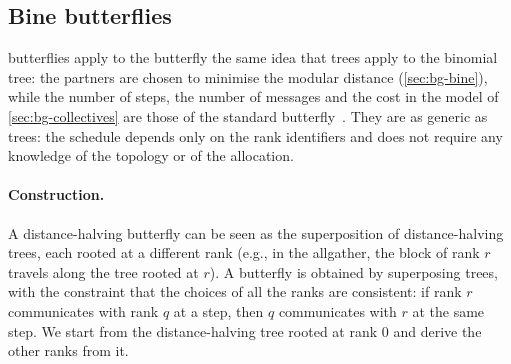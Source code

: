 \subsection{Bine butterflies}\label{sec:bg-bine-butterfly}

\bine{} butterflies apply to the butterfly the same idea that \bine{} trees apply to the binomial tree: the partners are chosen to minimise the modular distance (\cref{sec:bg-bine}), while the number of steps, the number of messages and the cost in the model of \cref{sec:bg-collectives} are those of the standard butterfly~\cite{desensi2025bine}.
They are as generic as \bine{} trees: the schedule depends only on the rank identifiers and does not require any knowledge of the topology or of the allocation.

\paragraph{Construction.}
A distance-halving butterfly can be seen as the superposition of distance-halving trees, each rooted at a different rank (e.g., in the allgather, the block of rank $r$ travels along the tree rooted at $r$).
A \bine{} butterfly is obtained by superposing \bine{} trees, with the constraint that the choices of all the ranks are consistent: if rank $r$ communicates with rank $q$ at a step, then $q$ communicates with $r$ at the same step.
We start from the distance-halving \bine{} tree rooted at rank $0$ and derive the other ranks from it.

